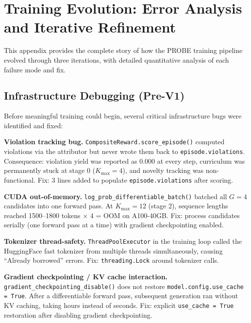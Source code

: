 \appendix

\section{Training Evolution: Error Analysis and Iterative Refinement}
\label{app:evolution}

This appendix provides the complete story of how the PROBE training pipeline evolved through three iterations, with detailed quantitative analysis of each failure mode and fix.

\subsection{Infrastructure Debugging (Pre-V1)}

Before meaningful training could begin, several critical infrastructure bugs were identified and fixed:

\textbf{Violation tracking bug.}
\texttt{CompositeReward.score\_episode()} computed violations via the attributor but never wrote them back to \texttt{episode.violations}. Consequence: violation yield was reported as 0.000 at every step, curriculum was permanently stuck at stage 0 ($K_{\max}=4$), and novelty tracking was non-functional. Fix: 3 lines added to populate \texttt{episode.violations} after scoring.

\textbf{CUDA out-of-memory.}
\texttt{log\_prob\_differentiable\_batch()} batched all $G=4$ candidates into one forward pass. At $K_{\max}=12$ (stage 2), sequence lengths reached 1500--1800 tokens $\times$ 4 = OOM on A100-40GB. Fix: process candidates serially (one forward pass at a time) with gradient checkpointing enabled.

\textbf{Tokenizer thread-safety.}
\texttt{ThreadPoolExecutor} in the training loop called the HuggingFace fast tokenizer from multiple threads simultaneously, causing ``Already borrowed'' errors. Fix: \texttt{threading.Lock} around tokenizer calls.

\textbf{Gradient checkpointing / KV cache interaction.}
\texttt{gradient\_checkpointing\_disable()} does not restore \texttt{model.config.use\_cache = True}. After a differentiable forward pass, subsequent generation ran without KV caching, taking hours instead of seconds. Fix: explicit \texttt{use\_cache = True} restoration after disabling gradient checkpointing.


